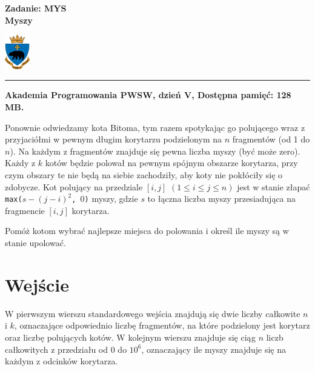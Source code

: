 \documentclass[10pt]{article}
\begin{document}
    

    \noindent
    \begin{minipage}{0.5\textwidth}
        \LARGE{\textsf{\textbf{Zadanie: MYS\\Myszy}}}
    \end{minipage}
    \begin{minipage}{0.5\textwidth}
        \begin{flushright}
            \includegraphics[height=1.5cm]{logo.jpg}
        \end{flushright}
    \end{minipage}
    
    \noindent\rule{\textwidth}{0.4pt}
    
    \noindent\textbf{Akademia Programowania PWSW, dzień V, Dostępna pamięć: 128 MB.}
    \vspace{1em}
    
    
    \noindent
    Ponownie odwiedzamy kota Bitoma, tym razem spotykając go polującego wraz z przyjaciółmi w pewnym długim korytarzu podzielonym na $n$ fragmentów (od 1 do $n$). Na każdym z fragmentów znajduje się pewna liczba myszy (być może zero). Każdy z $k$ kotów będzie polował na pewnym spójnym obszarze korytarza, przy czym obszary te nie będą na siebie zachodziły, aby koty nie pokłóciły się o zdobycze. Kot polujący na przedziale $[i, j]$ $(1\leq i\leq j\leq n)$ jest w stanie złapać \texttt{max($s - (j - i)^{2}$, $0$)} myszy, gdzie $s$ to łączna liczba myszy przesiadująca na fragmencie $[i, j]$ korytarza.
    
    Pomóż kotom wybrać najlepsze miejsca do polowania i określ ile myszy są w stanie upolować.
    


    \section*{Wejście}
    
    W pierwszym wierszu standardowego wejścia znajdują się dwie liczby całkowite $n$ i $k$, oznaczające odpowiednio liczbę fragmentów, na które podzielony jest korytarz oraz liczbę polujących kotów. W kolejnym wierszu znajduje się ciąg $n$ liczb całkowitych z przedziału od 0 do $10^{6}$, oznaczający ile myszy znajduje się na każdym z odcinków korytarza.
\end{document}
